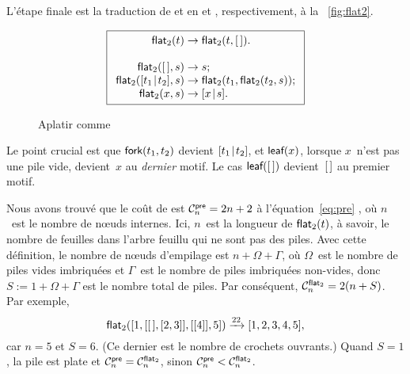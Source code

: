 L'étape finale est la traduction de  et  en
 et , respectivement, à la
\fig~\vref{fig:flat2}.
\begin{figure}[b]
\begin{equation*}
\boxed{
\begin{array}{r@{\;}c@{\;}l}
\fun{flat}_2(t) & \rightarrow & \fun{flat}_2(t,\el).\\
\\
\fun{flat}_2(\el,s) & \rightarrow & s;\\
\fun{flat}_2(\cons{t_1}{t_2},s)
  & \rightarrow & \fun{flat}_2(t_1,\fun{flat}_2(t_2,s));\\
\fun{flat}_2(x,s) & \rightarrow & \cons{x}{s}.
\end{array}}
\end{equation*}
\caption{Aplatir comme }
\label{fig:flat2}
\end{figure}
Le point crucial est que
\(\fun{fork}(t_1,t_2)\) devient
\(\cons{t_1}{t_2}\), et \(\fun{leaf}(x)\), lorsque \(x\)~n'est pas une
pile vide, devient~\(x\) au \emph{dernier} motif. Le cas
\(\fun{leaf}(\el)\) devient~\(\el\) au
premier motif.

Nous avons trouvé que le coût de 
est \(\C{\fun{pre}}{n} = 2n+2\) à
l'équation~\eqref{eq:pre} , où \(n\)~est le nombre de
nœuds internes. Ici, \(n\)~est la longueur de
\(\fun{flat}_2(t)\), à savoir, le
nombre de feuilles dans l'arbre feuillu qui ne sont pas des
piles. Avec cette définition, le nombre de nœuds d'empilage est
\(n + \Omega + \Gamma\), où \(\Omega\)~est le nombre de piles vides
imbriquées et \(\Gamma\)~est le nombre de piles imbriquées non-vides,
donc \(S := 1 + \Omega + \Gamma\) est le nombre total de piles. Par
conséquent, \(\C{\fun{flat}_2}{n} = 2(n +
S)\). Par exemple,
\begin{equation*}
\fun{flat}_2([1,[\el,[2,3]],[[4]],5]) \xrightarrow{22} [1,2,3,4,5],
\end{equation*}
car \(n=5\) et \(S=6\). (Ce dernier est le nombre de crochets
ouvrants.)  Quand \(S=1\), la pile est plate et \(\C{\fun{pre}}{n} =
\C{\fun{flat}_2}{n}\), sinon \(\C{\fun{pre}}{n} <
\C{\fun{flat}_2}{n}\).

\label{inorder}

